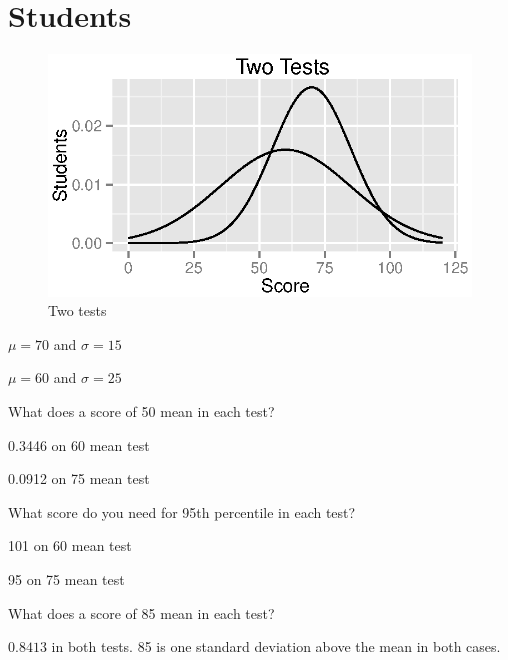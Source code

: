 \documentclass{exam}
\begin{document}
  \section{Students}
  \begin{figure}[H]
    \centering
    \includegraphics{figures/two_tests.eps}
    \caption{Two tests}
  \end{figure}

  \begin{itemize*}
    \item $\mu = 70$ and $\sigma = 15$
    \item $\mu = 60$ and $\sigma = 25$
  \end{itemize*}

  \begin{itemize*}
    \item What does a score of 50 mean in each test?
      \begin{solution}
        \begin{itemize*}
          \item 0.3446 on 60 mean test
          \item 0.0912 on 75 mean test
        \end{itemize*}
      \end{solution}

    \item What score do you need for 95th percentile in each test?
      \begin{solution}
        \begin{itemize*}
          \item 101 on 60 mean test
          \item 95 on 75 mean test
        \end{itemize*}
      \end{solution}

    \item What does a score of 85 mean in each test?
      \begin{solution}
        $0.8413$ in both tests.  85 is one standard deviation above the mean in both
        cases.
      \end{solution}
  \end{itemize*}
\end{document}
